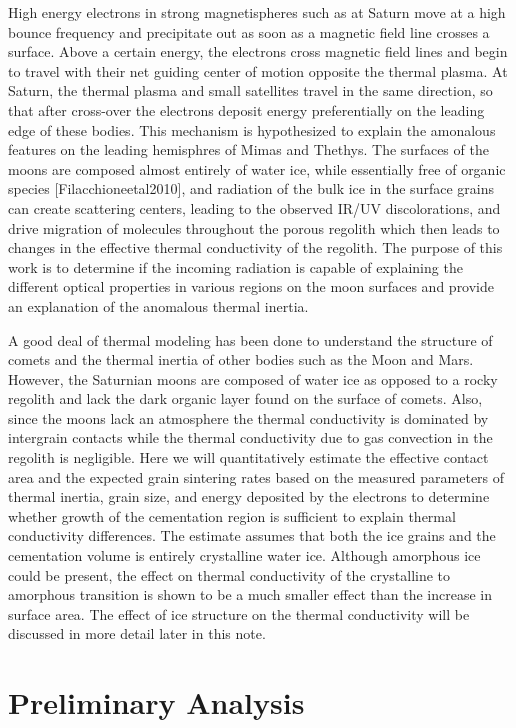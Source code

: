 \documentclass[11pt]{article} %
\begin{document}
	  High energy electrons in strong magnetispheres such as at Saturn move at a high bounce frequency and precipitate out as soon as a magnetic field line crosses a surface. Above a certain energy, the electrons cross magnetic field lines and begin to travel with their net guiding center of motion opposite the thermal plasma. At Saturn, the thermal plasma and small satellites travel in the same direction, so that after cross-over the electrons deposit energy preferentially on the leading edge of these bodies. This mechanism is hypothesized to explain the amonalous features on the leading hemisphres of Mimas and Thethys. The surfaces of the moons are composed almost entirely of water ice, while essentially free of organic species [Filacchioneetal2010], and radiation of the bulk ice in the surface grains can create scattering centers, leading to the observed IR/UV discolorations, and drive migration of molecules throughout the porous regolith which then leads to changes in the effective thermal conductivity of the regolith. The purpose of this work is to determine if the incoming radiation is capable of explaining the different optical properties in various regions on the moon surfaces and provide an explanation of the anomalous thermal inertia.

	A good deal of thermal modeling has been done to understand the structure of comets and the thermal inertia of other bodies such as the Moon and Mars. However, the Saturnian moons are composed of water ice as opposed to a rocky regolith and lack the dark organic layer found on the surface of comets. Also, since the moons lack an atmosphere the thermal conductivity is dominated by intergrain contacts while the thermal conductivity due to gas convection in the regolith is negligible. Here we will quantitatively estimate the effective contact area and the expected grain sintering rates based on the measured parameters of thermal inertia, grain size, and energy deposited by the electrons to determine whether growth of the cementation region is sufficient to explain thermal conductivity differences. The estimate assumes that both the ice grains and the cementation volume is entirely crystalline water ice. Although amorphous ice could be present, the effect on thermal conductivity of the crystalline to amorphous transition is shown to be a much smaller effect than the increase in surface area. The effect of ice structure on the thermal conductivity will be discussed in more detail later in this note.

\section{Preliminary Analysis}
\end{document}

